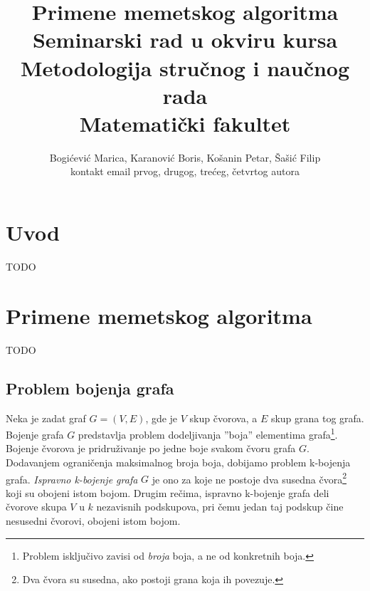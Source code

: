 \documentclass[a4paper]{article}
\begin{document}
\title{Primene memetskog algoritma\\ \small{Seminarski rad u okviru kursa\\Metodologija stručnog i naučnog rada\\ Matematički fakultet}}

\author{Bogićević Marica, Karanović Boris, Košanin Petar, Šašić Filip\\ kontakt email prvog, drugog, trećeg, četvrtog autora}


\maketitle


\tableofcontents

\newpage

\section{Uvod}
\label{sec:uvod}

TODO



\section{Primene memetskog algoritma}
\label{sec:primene_memetskog_algoritma}
TODO


\subsection{Problem bojenja grafa}
\label{sec:bojenje_grafa}
Neka je zadat graf $G = (V, E)$, gde je $V$ skup čvorova, a $E$ skup grana tog grafa. Bojenje grafa $G$ predstavlja problem dodeljivanja ''boja'' elementima grafa\footnote{Problem isključivo zavisi od \textit{broja} boja, a ne od konkretnih boja.}. Bojenje čvorova je pridruživanje po jedne boje svakom čvoru grafa $G$. Dodavanjem ograničenja maksimalnog broja boja, dobijamo problem k-bojenja grafa. \textit{Ispravno k-bojenje grafa} $G$ je ono za koje ne postoje dva susedna čvora\footnote{Dva čvora su susedna, ako postoji grana koja ih povezuje.} koji su obojeni istom bojom. Drugim rečima, ispravno k-bojenje grafa deli čvorove skupa $V$ u $k$ nezavisnih podskupova, pri čemu jedan taj podskup čine nesusedni čvorovi, obojeni istom bojom.
\end{document}
